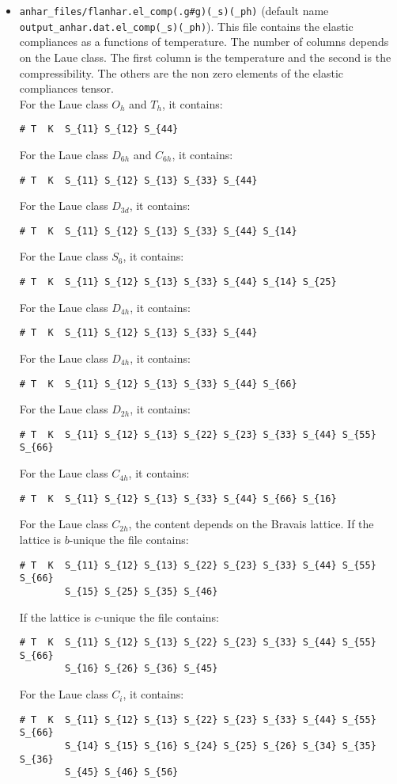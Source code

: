 \documentclass[12pt,a4paper]{article}
\begin{document}
\begin{itemize}
\item
\texttt{anhar\_files/flanhar.el\_comp(.g\#g)(\_s)(\_ph)}
(default name \texttt{output\_anhar.dat.el\_comp(\_s)(\_ph)}). This file
contains the elastic compliances as a functions of temperature. 
The number of columns depends on the Laue class. The first column is the 
temperature and the second is the compressibility. The others are the
non zero elements of the elastic compliances tensor. \\ 
For the Laue class $O_h$ and $T_h$, it contains:
\begin{verbatim}
# T  K  S_{11} S_{12} S_{44}   
\end{verbatim}
For the Laue class $D_{6h}$ and $C_{6h}$, it contains:
\begin{verbatim}
# T  K  S_{11} S_{12} S_{13} S_{33} S_{44}  
\end{verbatim}
For the Laue class $D_{3d}$, it contains:
\begin{verbatim}
# T  K  S_{11} S_{12} S_{13} S_{33} S_{44} S_{14}  
\end{verbatim}
For the Laue class $S_{6}$, it contains:
\begin{verbatim}
# T  K  S_{11} S_{12} S_{13} S_{33} S_{44} S_{14} S_{25}  
\end{verbatim}
For the Laue class $D_{4h}$, it contains:
\begin{verbatim}
# T  K  S_{11} S_{12} S_{13} S_{33} S_{44}
\end{verbatim}
For the Laue class $D_{4h}$, it contains:
\begin{verbatim}
# T  K  S_{11} S_{12} S_{13} S_{33} S_{44} S_{66} 
\end{verbatim}
For the Laue class $D_{2h}$, it contains:
\begin{verbatim}
# T  K  S_{11} S_{12} S_{13} S_{22} S_{23} S_{33} S_{44} S_{55} S_{66}
\end{verbatim}
For the Laue class $C_{4h}$, it contains:
\begin{verbatim}
# T  K  S_{11} S_{12} S_{13} S_{33} S_{44} S_{66} S_{16}  
\end{verbatim}
For the Laue class $C_{2h}$, the content depends on the Bravais lattice. 
If the lattice is $b$-unique the file contains:
\begin{verbatim}
# T  K  S_{11} S_{12} S_{13} S_{22} S_{23} S_{33} S_{44} S_{55} S_{66} 
        S_{15} S_{25} S_{35} S_{46} 
\end{verbatim}
If the lattice is $c$-unique the file contains:
\begin{verbatim}
# T  K  S_{11} S_{12} S_{13} S_{22} S_{23} S_{33} S_{44} S_{55} S_{66} 
        S_{16} S_{26} S_{36} S_{45} 
\end{verbatim}
For the Laue class $C_i$, it contains:
\begin{verbatim}
# T  K  S_{11} S_{12} S_{13} S_{22} S_{23} S_{33} S_{44} S_{55} S_{66} 
        S_{14} S_{15} S_{16} S_{24} S_{25} S_{26} S_{34} S_{35} S_{36}
        S_{45} S_{46} S_{56}
\end{verbatim}

\end{itemize}
\end{document}
